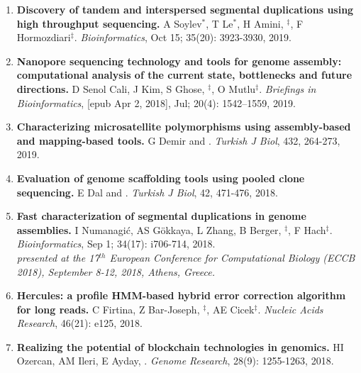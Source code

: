 \begin{enumerate}
\item
 {\bf Discovery of tandem and interspersed segmental duplications using high throughput sequencing.}
 A Soylev$^*$, T Le$^*$, H Amini, \calkan{}$^\ddag$, F Hormozdiari$^\ddag$.
{\em Bioinformatics}, Oct 15;   35(20): 3923-3930, 2019.


         
\item

         {\bf Nanopore sequencing technology and tools for genome assembly: computational analysis of the current state, bottlenecks and future directions.}
         D Senol Cali, J Kim, S Ghose, \calkan{}$^\ddag$, O Mutlu$^\ddag$.
         {\em Briefings in Bioinformatics}, [epub Apr 2, 2018], Jul;   20(4): 1542–1559, 2019.

\item
         {\bf Characterizing microsatellite polymorphisms using assembly-based and mapping-based tools.}  G Demir and \calkan{}. {\em Turkish J Biol}, 432, 264-273, 2019.


         \item
         {\bf Evaluation of genome scaffolding tools using pooled clone sequencing.}  E Dal and \calkan{}. {\em Turkish J Biol}, 42, 471-476, 2018.
         
         \item

         {\bf Fast characterization of segmental duplications in genome assemblies.}
         I Numanagić,  AS Gökkaya, L Zhang, B Berger, \calkan{}$^\ddag$, F Hach$^\ddag$.
         {\em Bioinformatics}, Sep 1;   34(17): i706-714, 2018.\\
         \hspace*{1cm}
          {\footnotesize \em presented at the 17$^{th}$ European Conference for Computational Biology (ECCB 2018), September 8-12, 2018, Athens, Greece.}

                \item
                {\bf Hercules: a profile HMM-based hybrid error correction algorithm for long reads.}
                C Firtina, Z Bar-Joseph, \calkan{}$^\ddag$, AE Cicek$^\ddag$.
                {\it Nucleic Acids Research}, 46(21): e125, 2018.
                
         \item

         {\bf Realizing the potential of blockchain technologies in genomics.}
         HI Ozercan, AM Ileri, E Ayday, \calkan{}.
         {\em Genome Research}, 28(9): 1255-1263, 2018.


\end{enumerate}
